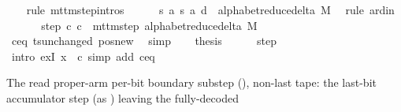 \begin{isabellebody}
\ \ \isamarkupfalse%
\ {\isacharparenleft}{\kern0pt}rule\ mttm{\isacharunderscore}{\kern0pt}step{\isachardot}{\kern0pt}intros{\isacharparenright}{\kern0pt}\isanewline
\ \ \ \ \isamarkupfalse%
\ {\isachardoublequoteopen}{\isacharparenleft}{\kern0pt}{\isacharquery}{\kern0pt}s{\isacharcomma}{\kern0pt}\ {\isacharquery}{\kern0pt}a{\isacharcomma}{\kern0pt}\ {\isacharquery}{\kern0pt}s{\isacharprime}{\kern0pt}{\isacharcomma}{\kern0pt}\ {\isacharquery}{\kern0pt}a{\isacharcomma}{\kern0pt}\ {\isacharquery}{\kern0pt}d{\isacharparenright}{\kern0pt}\ {\isasymin}\ alphabet{\isacharunderscore}{\kern0pt}reduce{\isacharunderscore}{\kern0pt}delta\ M{\isachardoublequoteclose}\ \isamarkupfalse%
\ {\isacharparenleft}{\kern0pt}rule\ ard{\isacharunderscore}{\kern0pt}in{\isacharparenright}{\kern0pt}\isanewline
\ \ \isamarkupfalse%
\isanewline
\ \ \isamarkupfalse%
\ step{\isacharcolon}{\kern0pt}\ {\isachardoublequoteopen}{\isacharparenleft}{\kern0pt}c{\isacharprime}{\kern0pt}{\isacharcomma}{\kern0pt}\ {\isacharquery}{\kern0pt}c{\isacharprime}{\kern0pt}{\isacharprime}{\kern0pt}{\isacharparenright}{\kern0pt}\ {\isasymin}\ mttm{\isacharunderscore}{\kern0pt}step\ {\isacharparenleft}{\kern0pt}alphabet{\isacharunderscore}{\kern0pt}reduce{\isacharunderscore}{\kern0pt}delta\ M{\isacharparenright}{\kern0pt}{\isachardoublequoteclose}\isanewline
\ \ \ \ \isamarkupfalse%
\ c{\isacharprime}{\kern0pt}{\isacharunderscore}{\kern0pt}eq\ ts{\isacharunderscore}{\kern0pt}unchanged\ pos{\isacharunderscore}{\kern0pt}new\ \isamarkupfalse%
\ simp\isanewline
\ \ \isamarkupfalse%
\ {\isacharquery}{\kern0pt}thesis\isanewline
\ \ \ \ \isamarkupfalse%
\ step\ \isamarkupfalse%
\ {\isacharparenleft}{\kern0pt}intro\ exI{\isacharbrackleft}{\kern0pt}\ x\ {\isacharequal}{\kern0pt}\ {\isacharquery}{\kern0pt}c{\isacharprime}{\kern0pt}{\isacharprime}{\kern0pt}{\isacharbrackright}{\kern0pt}{\isacharparenright}{\kern0pt}\ {\isacharparenleft}{\kern0pt}simp\ add{\isacharcolon}{\kern0pt}\ c{\isacharprime}{\kern0pt}{\isacharunderscore}{\kern0pt}eq{\isacharparenright}{\kern0pt}\isanewline
{}\isamarkupfalse%
%
\endisatagproof
{\isafoldproof}%
%
\isadelimproof
%
\endisadelimproof
%
\begin{isamarkuptext}%
The read proper-arm per-bit boundary substep
  (), non-last tape: the last-bit accumulator step (as
  ) leaving  the fully-decoded

\end{isamarkuptext}
\end{isabellebody}
